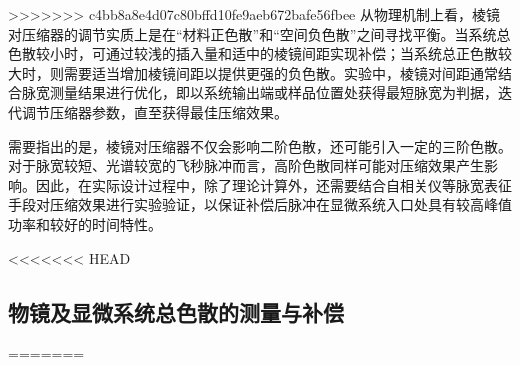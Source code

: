 >>>>>>> c4bb8a8e4d07c80bffd10fe9aeb672bafe56fbee
从物理机制上看，棱镜对压缩器的调节实质上是在``材料正色散''和``空间负色散''之间寻找平衡。当系统总色散较小时，可通过较浅的插入量和适中的棱镜间距实现补偿；当系统总正色散较大时，则需要适当增加棱镜间距以提供更强的负色散。实验中，棱镜对间距通常结合脉宽测量结果进行优化，即以系统输出端或样品位置处获得最短脉宽为判据，迭代调节压缩器参数，直至获得最佳压缩效果。

需要指出的是，棱镜对压缩器不仅会影响二阶色散，还可能引入一定的三阶色散。对于脉宽较短、光谱较宽的飞秒脉冲而言，高阶色散同样可能对压缩效果产生影响。因此，在实际设计过程中，除了理论计算外，还需要结合自相关仪等脉宽表征手段对压缩效果进行实验验证，以保证补偿后脉冲在显微系统入口处具有较高峰值功率和较好的时间特性。



<<<<<<< HEAD
\subsection{物镜及显微系统总色散的测量与补偿}\label{4.5.3}
=======
